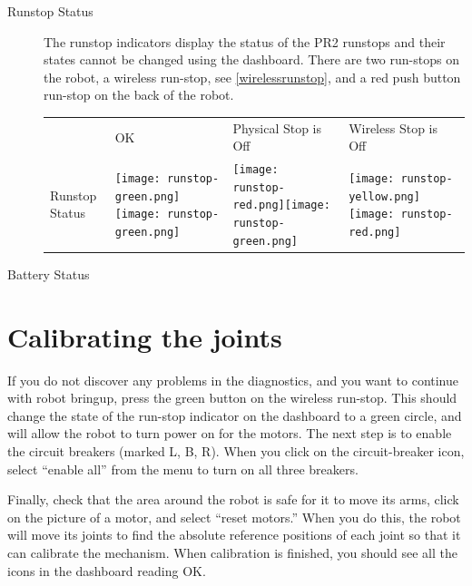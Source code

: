 \begin{description}
\item[Runstop Status] The runstop indicators display the status of the PR2 runstops and their states cannot be changed using the dashboard. 
There are two run-stops on the robot, a wireless run-stop, see \ref{wirelessrunstop}, and a red push button run-stop on the back of the robot.\\

    \begin{tabular}{m{2.6cm}SSS}
     & OK & Physical Stop is Off & Wireless Stop is Off\\
    Runstop Status & \texttt{[image: runstop-green.png]}\texttt{[image: runstop-green.png]}&
                     \texttt{[image: runstop-red.png]}\texttt{[image: runstop-green.png]}&
                     \texttt{[image: runstop-yellow.png]}\texttt{[image: runstop-red.png]}\\
   \end{tabular}


\item[Battery Status]
\end{description}

\section{Calibrating the joints}
If you do not discover any problems in the diagnostics, and you want to continue with robot bringup, press the green 
button on the wireless run-stop.  This should change the state of the run-stop indicator on the dashboard to a green 
circle, and will allow the robot to turn power on for the motors.  The next step is to enable the circuit breakers 
(marked L, B, R).  When you click on the circuit-breaker icon, select ``enable all'' from the menu to turn on all 
three breakers.

Finally, check that the area around the robot is safe for it to move its arms, click on the picture of a motor, and 
select ``reset motors.''  When you do this, the robot will move its joints to find the absolute reference positions of 
each joint so that it can calibrate the mechanism.  When calibration is finished, you should see all the icons in the 
dashboard reading OK.
